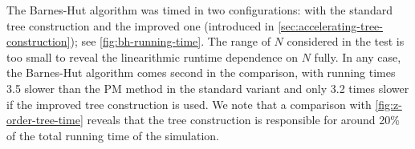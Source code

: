 The Barnes-Hut algorithm was timed in two configurations: with the standard tree construction and the improved one (introduced in \autoref{sec:accelerating-tree-construction}); see \autoref{fig:bh-running-time}.
The range of $N$ considered in the test is too small to reveal the linearithmic runtime dependence on $N$ fully.
In any case, the Barnes-Hut algorithm comes second in the comparison, with running times 3.5 slower than the PM method in the standard variant and only 3.2 times slower if the improved tree construction is used.
We note that a comparison with \autoref{fig:z-order-tree-time} reveals that the tree construction is responsible for around 20\% of the total running time of the simulation.